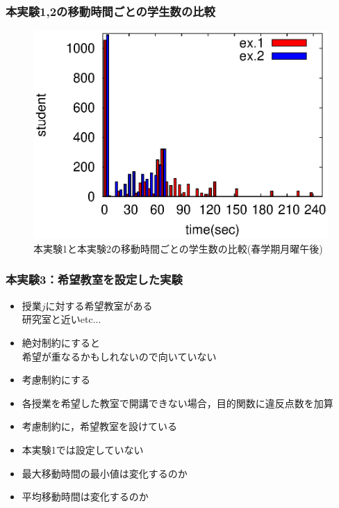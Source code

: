 \documentclass[dvipdfmx,12pt]{beamer}
\begin{document}
\begin{frame}\frametitle{本実験1,2の移動時間ごとの学生数の比較}

\begin{figure}[thpb]
\begin{center}
\vspace{-10mm}
\hspace{-11mm}
\includegraphics[bb=0 0 390 248,clip,scale=0.7,width=13cm]{omonagapawapo.eps}
\vspace{-3mm}
\caption{本実験1と本実験2の移動時間ごとの学生数の比較(春学期月曜午後)}
\label{omo12}
\end{center}

\end{figure}

\end{frame}



\begin{frame}\frametitle{本実験3：希望教室を設定した実験}
\begin{itemize}

\item 授業$j$に対する希望教室がある　\\
研究室と近いetc...\\
\item 絶対制約にすると\\
希望が重なるかもしれないので向いていない\\
\item 考慮制約にする
\item 各授業を希望した教室で開講できない場合，目的関数に違反点数を加算

\end{itemize}
\begin{itemize}
\item 考慮制約に，希望教室を設けている
\item 本実験1では設定していない
\item 最大移動時間の最小値は変化するのか
\item 平均移動時間は変化するのか
\end{itemize}
\end{frame}
\end{document}
